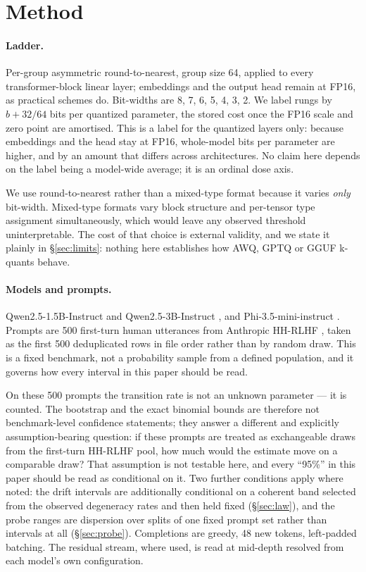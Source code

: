 \documentclass[11pt,a4paper]{article}
\begin{document}
\section{Method}

\paragraph{Ladder.} Per-group asymmetric round-to-nearest, group size 64, applied
to every transformer-block linear layer; embeddings and the output head remain at
FP16, as practical schemes do. Bit-widths are 8, 7, 6, 5, 4, 3, 2. We label rungs
by $b + 32/64$ bits per quantized parameter, the stored cost once the FP16 scale
and zero point are amortised. This is a label for the quantized layers only:
because embeddings and the head stay at FP16, whole-model bits per parameter are
higher, and by an amount that differs across architectures. No claim here depends
on the label being a model-wide average; it is an ordinal dose axis.

We use round-to-nearest rather than a mixed-type format because it varies
\emph{only} bit-width. Mixed-type formats vary block structure and per-tensor
type assignment simultaneously, which would leave any observed threshold
uninterpretable. The cost of that choice is external validity, and we state it
plainly in \S\ref{sec:limits}: nothing here establishes how AWQ, GPTQ or GGUF
k-quants behave.

\paragraph{Models and prompts.} Qwen2.5-1.5B-Instruct and Qwen2.5-3B-Instruct
\citep{qwen2024report}, and Phi-3.5-mini-instruct \citep{abdin2024phi3}. Prompts
are 500 first-turn human utterances from Anthropic HH-RLHF \citep{bai2022hh},
taken as the first 500 deduplicated rows in file order rather than by random
draw. This is a fixed benchmark, not a probability sample from a defined
population, and it governs how every interval in this paper should be read.

On these 500 prompts the transition rate is not an unknown parameter --- it is
counted. The bootstrap and the exact binomial bounds are therefore not
benchmark-level confidence statements; they answer a different and explicitly
assumption-bearing question: if these prompts are treated as exchangeable draws
from the first-turn HH-RLHF pool, how much would the estimate move on a
comparable draw? That assumption is not testable here, and every ``95\%'' in
this paper should be read as conditional on it. Two further conditions apply
where noted: the drift intervals are additionally conditional on a coherent band
selected from the observed degeneracy rates and then held fixed
(\S\ref{sec:law}), and the probe ranges are dispersion over splits of one fixed
prompt set rather than intervals at all (\S\ref{sec:probe}). Completions are
greedy, 48 new tokens, left-padded batching.
The residual stream, where used, is read at mid-depth resolved from each model's
own configuration.
\end{document}
